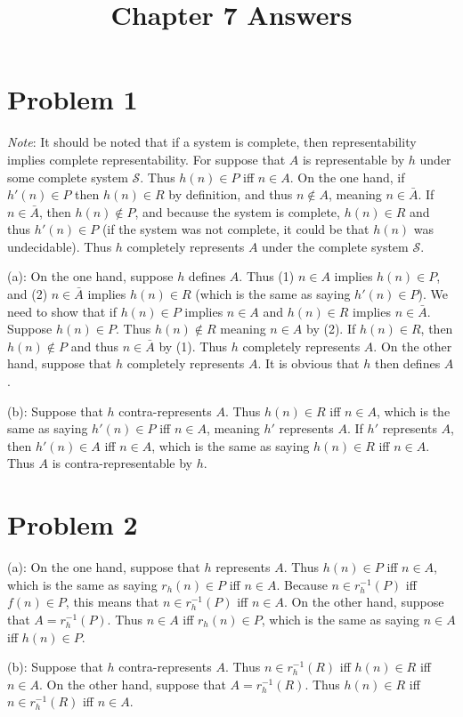 \documentclass{article}
\title{Chapter 7 Answers}
\theoremstyle{definition}
\begin{document}
\date{}
\maketitle

\section*{Problem 1}
\textit{Note}: It should be noted that if a system is complete, then representability implies complete representability. For suppose that $A$ is 
representable by $h$ under some complete system $\mathcal{S}$. Thus $h(n)\in P$ iff $n\in A$. On the one hand, if $h'(n)\in P$ then $h(n)\in R$ by definition, and 
thus $n\notin A$, meaning $n\in\bar{A}$. If $n\in\bar{A}$, then $h(n)\notin P$, and because the system is complete, $h(n)\in R$ and thus $h'(n)\in P$ (if the 
system was not complete, it could be that $h(n)$ was undecidable). Thus $h$ completely represents $A$ under the complete system $\mathcal{S}$.


(a): On the one hand, suppose $h$ defines $A$. Thus (1) $n\in A$ implies $h(n)\in P$, and (2) $n\in\bar{A}$ implies $h(n)\in R$ (which is the same as saying 
$h'(n)\in P$). We need to show that if $h(n)\in P$ implies $n\in A$ and $h(n)\in R$ implies $n\in\bar{A}$. Suppose $h(n)\in P$. 
Thus $h(n)\notin R$ meaning $n\in A$ by (2). If $h(n)\in R$, then $h(n)\notin P$ and thus $n\in\bar{A}$ by (1). Thus $h$ completely represents $A$. On the other hand, 
suppose that $h$ completely represents $A$. It is obvious that $h$ then defines $A$.


(b): Suppose that $h$ contra-represents $A$. Thus $h(n)\in R$ iff $n\in A$, which is the same as saying $h'(n)\in P$ iff $n\in A$, meaning $h'$ represents $A$. 
If $h'$ represents $A$, then $h'(n)\in A$ iff $n\in A$, which is the same as saying $h(n)\in R$ iff $n\in A$. Thus $A$ is contra-representable by $h$.

\section*{Problem 2}
(a): On the one hand, suppose that $h$ represents $A$. Thus $h(n)\in P$ iff $n\in A$, which is the same as saying $r_h(n)\in P$ iff $n\in A$. Because 
$n\in r_h^{-1}(P)$ iff $f(n)\in P$, this means that $n\in r_h^{-1}(P)$ iff $n\in A$. On the other hand, suppose that $A=r_h^{-1}(P)$. Thus 
$n\in A$ iff $r_h(n)\in P$, which is the same as saying $n\in A$ iff $h(n)\in P$. 


(b): Suppose that $h$ contra-represents $A$. Thus $n\in r_h^{-1}(R)$ iff $h(n)\in R$ iff $n\in A$. On the other hand, suppose that $A=r_h^{-1}(R)$. 
Thus $h(n)\in R$ iff $n\in r_h^{-1}(R)$ iff $n\in A$.
\end{document}
